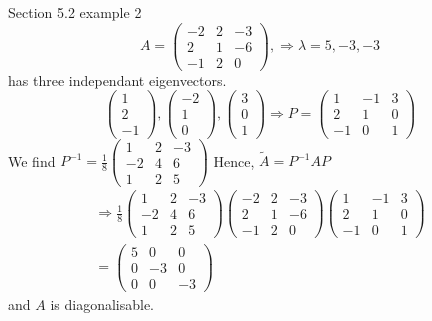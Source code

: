 \documentclass{article}
\numberwithin{equation}{section}
\begin{document}
\begin{eg} Section 5.2 example 2
    \[
        A = \begin{pmatrix}
            -2 & 2 & -3 \\
            2 & 1 & -6 \\
            -1 & 2 & 0
        \end{pmatrix}, 
        \Rightarrow \lambda = 5, -3, -3
    \]
    has three independant eigenvectors.
    \[
        \begin{pmatrix}
            1 \\ 2 \\ -1
        \end{pmatrix},
        \begin{pmatrix}
            -2 \\ 1 \\ 0
        \end{pmatrix},
        \begin{pmatrix}
            3 \\ 0 \\ 1
        \end{pmatrix}
        \Rightarrow P = \begin{pmatrix}
            1 & -1 & 3 \\
            2 & 1 & 0 \\
            -1 & 0 & 1
        \end{pmatrix}
    \]
    We find $P^{-1} = \frac{1}{8} \begin{pmatrix}
        1 & 2 & -3 \\
        -2 & 4 & 6 \\
        1 & 2 & 5
    \end{pmatrix}$ Hence, $\tilde{A} = P^{-1} A P$
    \begin{align*}
        \Rightarrow \frac{1}{8} \begin{pmatrix}
            1 & 2 & -3 \\
            -2 & 4 & 6 \\
            1 & 2 & 5
        \end{pmatrix}\begin{pmatrix}
            -2 & 2 & -3 \\
            2 & 1 & -6 \\
            -1 & 2 & 0
        \end{pmatrix}\begin{pmatrix}
            1 & -1 & 3 \\
            2 & 1 & 0 \\
            -1 & 0 & 1
        \end{pmatrix}\\
        = \begin{pmatrix}
            5 & 0 & 0 \\
            0 & -3 & 0 \\
            0 & 0 & -3
        \end{pmatrix}
    \end{align*}
    and $A$ is diagonalisable.
\end{eg}
\end{document}
